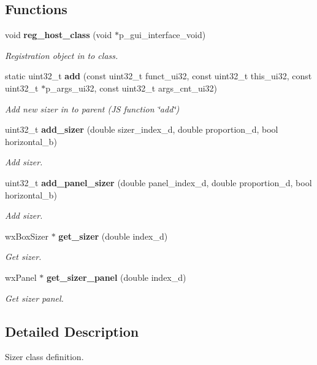 \subsection*{Functions}
\begin{DoxyCompactItemize}
\item 
void \textbf{ reg\+\_\+host\+\_\+class} (void $\ast$p\+\_\+gui\+\_\+interface\+\_\+void)
\begin{DoxyCompactList}\small\item\em Registration object in to class. \end{DoxyCompactList}\item 
static uint32\+\_\+t \textbf{ add} (const uint32\+\_\+t funct\+\_\+ui32, const uint32\+\_\+t this\+\_\+ui32, const uint32\+\_\+t $\ast$p\+\_\+args\+\_\+ui32, const uint32\+\_\+t args\+\_\+cnt\+\_\+ui32)
\begin{DoxyCompactList}\small\item\em Add new sizer in to parent (JS function \char`\"{}add\char`\"{}) \end{DoxyCompactList}\item 
uint32\+\_\+t \textbf{ add\+\_\+sizer} (double sizer\+\_\+index\+\_\+d, double proportion\+\_\+d, bool horizontal\+\_\+b)
\begin{DoxyCompactList}\small\item\em Add sizer. \end{DoxyCompactList}\item 
uint32\+\_\+t \textbf{ add\+\_\+panel\+\_\+sizer} (double panel\+\_\+index\+\_\+d, double proportion\+\_\+d, bool horizontal\+\_\+b)
\begin{DoxyCompactList}\small\item\em Add sizer. \end{DoxyCompactList}\item 
wx\+Box\+Sizer $\ast$ \textbf{ get\+\_\+sizer} (double index\+\_\+d)
\begin{DoxyCompactList}\small\item\em Get sizer. \end{DoxyCompactList}\item 
wx\+Panel $\ast$ \textbf{ get\+\_\+sizer\+\_\+panel} (double index\+\_\+d)
\begin{DoxyCompactList}\small\item\em Get sizer panel. \end{DoxyCompactList}\end{DoxyCompactItemize}


\subsection{Detailed Description}
Sizer class definition. 

